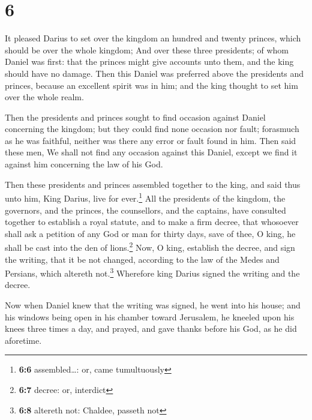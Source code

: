 \hypertarget{section-5}{%
\section{6}\label{section-5}}

 It pleased Darius to set over the kingdom an hundred and
twenty princes, which should be over the whole kingdom; 
And over these three presidents; of whom Daniel was first: that the
princes might give accounts unto them, and the king should have no
damage.  Then this Daniel was preferred above the
presidents and princes, because an excellent spirit was in him; and the
king thought to set him over the whole realm.

 Then the presidents and princes sought to find occasion
against Daniel concerning the kingdom; but they could find none occasion
nor fault; forasmuch as he was faithful, neither was there any error or
fault found in him.  Then said these men, We shall not
find any occasion against this Daniel, except we find it against him
concerning the law of his God.

 Then these presidents and princes assembled together to
the king, and said thus unto him, King Darius, live for ever.\footnote{\textbf{6:6}
  assembled\ldots: or, came tumultuously}  All the
presidents of the kingdom, the governors, and the princes, the
counsellors, and the captains, have consulted together to establish a
royal statute, and to make a firm decree, that whosoever shall ask a
petition of any God or man for thirty days, save of thee, O king, he
shall be cast into the den of lions.\footnote{\textbf{6:7} decree: or,
  interdict}  Now, O king, establish the decree, and sign
the writing, that it be not changed, according to the law of the Medes
and Persians, which altereth not.\footnote{\textbf{6:8} altereth not:
  Chaldee, passeth not}  Wherefore king Darius signed the
writing and the decree.

 Now when Daniel knew that the writing was signed, he
went into his house; and his windows being open in his chamber toward
Jerusalem, he kneeled upon his knees three times a day, and prayed, and
gave thanks before his God, as he did aforetime.

